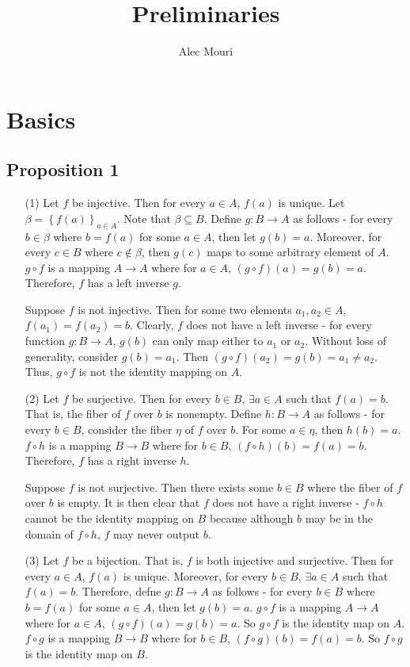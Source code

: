 \documentclass[12pt]{article}
\begin{document}
\title{Preliminaries}
\author{Alec Mouri}

\maketitle
\section{Basics}
\subsection*{Proposition 1}
\begin{itemize}
\item[(1)] Let $f$ be injective. Then for every $a \in A$, $f(a)$ is unique. Let $\beta = \left\lbrace f(a) \right\rbrace_{a \in A}$. Note that $\beta \subseteq B$. Define $g : B \rightarrow A$ as follows - for every $b \in \beta$ where $b = f(a)$ for some $a \in A$, then let $g(b) = a$. Moreover, for every $c \in B$ where $c \not \in \beta$, then $g(c)$ maps to some arbitrary element of $A$. $g \circ f$ is a mapping $A \rightarrow A$ where for $a \in A$, $(g \circ f)(a) = g(b) = a$. Therefore, $f$ has a left inverse $g$.

Suppose $f$ is not injective. Then for some two elements $a_1, a_2 \in A$, $f(a_1) = f(a_2) = b$. Clearly, $f$ does not have a left inverse - for every function $g : B \rightarrow A$, $g(b)$ can only map either to $a_1$ or $a_2$. Without loss of generality, consider $g(b) = a_1$. Then $(g \circ f)(a_2) = g(b) = a_1 \neq a_2$. Thus, $g \circ f$ is not the identity mapping on $A$.

\item[(2)] Let $f$ be surjective. Then for every $b \in B$, $\exists a \in A$ such that $f(a) = b$. That is, the fiber of $f$ over $b$ is nonempty. Define $h : B \rightarrow A$ as follows - for every $b \in B$, consider the fiber $\eta$ of $f$ over $b$. For some $a \in \eta$, then $h(b) = a$. $f \circ h$ is a mapping $B \rightarrow B$ where for $b \in B$, $(f \circ h)(b) = f(a) = b$. Therefore, $f$ has a right inverse $h$.

Suppose $f$ is not surjective. Then there exists some $b \in B$ where the fiber of $f$ over $b$ is empty. It is then clear that $f$ does not have a right inverse - $f \circ h$ cannot be the identity mapping on $B$ because although $b$ may be in the domain of $f \circ h$, $f$ may never output $b$.

\item[(3)] Let $f$ be a bijection. That is, $f$ is both injective and surjective. Then for every $a \in A$, $f(a)$ is unique. Moreover, for every $b \in B$, $\exists a \in A$ such that $f(a) = b$. Therefore, defne $g : B \rightarrow A$ as follows - for every $b \in B$ where $b = f(a)$ for some $a \in A$, then let $g(b) = a$. $g \circ f$ is a mapping $A \rightarrow A$ where for $a \in A$, $(g \circ f)(a) = g(b) = a$. So $g \circ f$ is the identity map on $A$. $f \circ g$ is a mapping $B \rightarrow B$ where for $b \in B$, $(f \circ g)(b) = f(a) = b$. So $f \circ g$ is the identity map on $B$.


\end{itemize}
\end{document}
